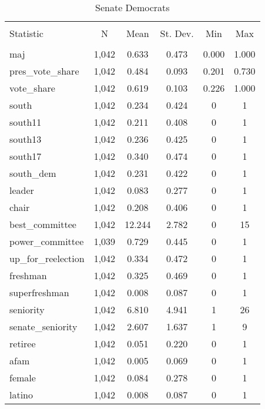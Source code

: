 \documentclass[12pt]{article}
\begin{document}

\begin{table}[ht] \centering 
	\caption{Senate Democrats} 
	\label{} 
	\begin{tabular}{@{\extracolsep{5pt}}lccccc} 
		\\[-1.8ex]\hline 
		\hline \\[-1.8ex] 
		Statistic & \multicolumn{1}{c}{N} & \multicolumn{1}{c}{Mean} & \multicolumn{1}{c}{St. Dev.} & \multicolumn{1}{c}{Min} & \multicolumn{1}{c}{Max} \\ 
		\hline \\[-1.8ex] 
		maj & 1,042 & 0.633 & 0.473 & 0.000 & 1.000 \\ 
		pres\_vote\_share & 1,042 & 0.484 & 0.093 & 0.201 & 0.730 \\ 
		vote\_share & 1,042 & 0.619 & 0.103 & 0.226 & 1.000 \\ 
		south & 1,042 & 0.234 & 0.424 & 0 & 1 \\ 
		south11 & 1,042 & 0.211 & 0.408 & 0 & 1 \\ 
		south13 & 1,042 & 0.236 & 0.425 & 0 & 1 \\ 
		south17 & 1,042 & 0.340 & 0.474 & 0 & 1 \\ 
		south\_dem & 1,042 & 0.231 & 0.422 & 0 & 1 \\ 
		leader & 1,042 & 0.083 & 0.277 & 0 & 1 \\ 
		chair & 1,042 & 0.208 & 0.406 & 0 & 1 \\ 
		best\_committee & 1,042 & 12.244 & 2.782 & 0 & 15 \\ 
		power\_committee & 1,039 & 0.729 & 0.445 & 0 & 1 \\ 
		up\_for\_reelection & 1,042 & 0.334 & 0.472 & 0 & 1 \\ 
		freshman & 1,042 & 0.325 & 0.469 & 0 & 1 \\ 
		superfreshman & 1,042 & 0.008 & 0.087 & 0 & 1 \\ 
		seniority & 1,042 & 6.810 & 4.941 & 1 & 26 \\ 
		senate\_seniority & 1,042 & 2.607 & 1.637 & 1 & 9 \\ 
		retiree & 1,042 & 0.051 & 0.220 & 0 & 1 \\ 
		afam & 1,042 & 0.005 & 0.069 & 0 & 1 \\ 
		female & 1,042 & 0.084 & 0.278 & 0 & 1 \\ 
		latino & 1,042 & 0.008 & 0.087 & 0 & 1 \\ 

\end{tabular}
\end{table}
\end{document}
